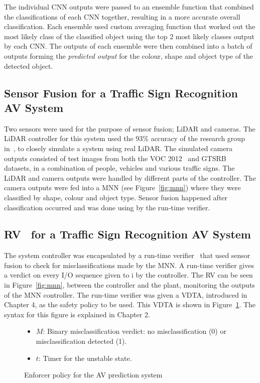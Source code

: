 The individual \ac{CNN} outputs were passed to an ensemble function that combined the classifications of each \ac{CNN} together, resulting in a more accurate overall classification.
Each ensemble used custom averaging function that worked out the most likely class of the classified object using the top 2 most likely classes output by each \ac{CNN}.
The outputs of each ensemble were then combined into a batch of outputs forming the \textit{predicted output} for the colour, shape and object type of the detected object.

\subsection{Sensor Fusion for a Traffic Sign Recognition AV System}
Two sensors were used for the purpose of sensor fusion; \ac{LiDAR} and cameras.
The \ac{LiDAR} controller for this system used the 93\% accuracy of the research group in~\cite{lidarFusion}, to closely simulate a system using real \ac{LiDAR}.
The simulated camera outputs consisted of test images from both the \ac{VOC} 2012~\cite{pascal-voc-2012} and \ac{GTSRB}~\cite{Stallkamp2012-gtsrb} datasets, in a combination of people, vehicles and various traffic signs.
The \ac{LiDAR} and camera outputs were handled by different parts of the controller.
The camera outputs were fed into a \ac{MNN} (see Figure~\ref{fig:mnn}) where they were classified by shape, colour and object type.
Sensor fusion happened after classification occurred and was done using by the run-time verifier.

\subsection{\acf{RV}~\cite{runtime-verify} for a Traffic Sign Recognition AV System}
The system controller was encapsulated by a run-time verifier~\cite{recps} that used sensor fusion to check for misclassifications made by the \ac{MNN}.
A run-time verifier gives a verdict on every I/O sequence given to i by the controller.
The \ac{RV} can be seen in Figure~\ref{fig:mnn}, between the controller and the plant, monitoring the outputs of the \ac{MNN} controller.
The run-time verifier was given a \acf{VDTA}, introduced in Chapter 4, as the safety policy to be used.
This \ac{VDTA} is shown in Figure~\ref{fig:signrte}.
The syntax for this figure is explained in Chapter 2.

\begin{figure}[h]
	\centering
	\scalebox{1}{}
	\begin{itemize}
		\item $M$: Binary misclassification verdict: no misclassification (0) or misclassification detected (1).
		\item $t$: Timer for the unstable state.
	\end{itemize}
	
	\caption{Enforcer policy for the \acf{AV} prediction system}
	\label{fig:signrte}
\end{figure}

